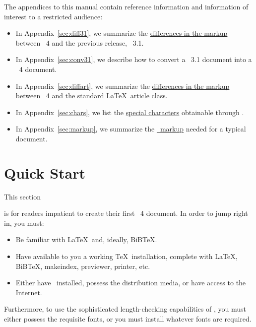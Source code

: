 \documentclass[%
prl%
,twocolumngrid%
,secnumarabic%
,amssymb]{revtex4}
\begin{document}
The appendices to this manual contain reference information and information of
interest to a restricted audience:
%
\begin{itemize}
\item
In Appendix~\ref{sec:diff31},
we summarize the \hyperlink{Tsec:diff31}{differences in the markup}
between \revtex~4 and the previous release, \revtex~3.1.

\item
In Appendix~\ref{sec:conv31},
we describe how to convert a \revtex~3.1 document into a \revtex~4 document.

\item
In Appendix~\ref{sec:diffart},
we summarize the \hyperlink{Tsec:diffart}{differences in the markup}
between \revtex~4 and the standard \LaTeX\ article class.

\item
In Appendix~\ref{sec:chars}, we list the 
\hyperlink{Tsec:chars}{special characters} obtainable through \revtex.

\item
In Appendix~\ref{sec:markup}, we summarize the \hyperlink{Tsec:markup}{\revtex\ markup} needed for
a typical document.

\end{itemize}


\section{Quick Start}\label{sec:quick}

\hypertarget{Tsec:quick}{This section} is for readers impatient to create their first \revtex~4 document.
In order to jump right in, you must:
\begin{itemize}
\item
Be familiar with \LaTeX\ and, ideally, BiB\TeX.

\item
Have available to you a working \TeX\ installation,
complete with \LaTeX, BiB\TeX, makeindex, previewer, printer, etc.

\item
Either have \revtex\ installed, possess the distribution media,
or have access to the Internet.

\end{itemize}

Furthermore, to use the sophisticated length-checking capabilities of \revtex,
you must either possess the requisite fonts,
or you must install whatever fonts are required.
\end{document}
